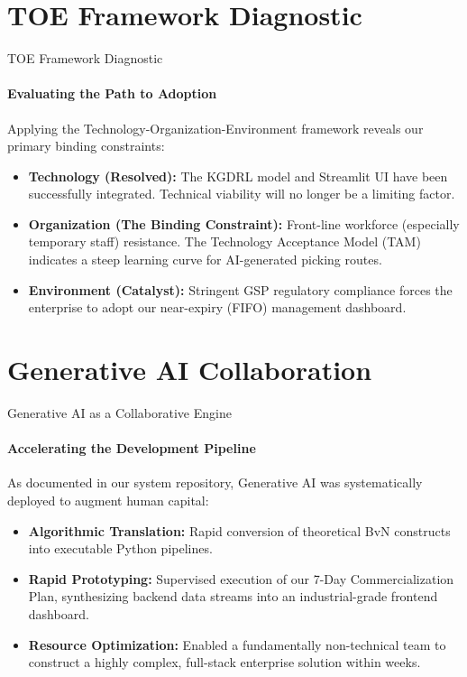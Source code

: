 \documentclass{beamer}
\begin{document}
\section{TOE Framework Diagnostic}

\begin{frame}{TOE Framework Diagnostic}
  \framesubtitle{Evaluating the Path to Adoption}
  
  Applying the Technology-Organization-Environment framework reveals our primary binding constraints:
  \vspace{0.3cm}
  \begin{itemize}
      \item \textbf{Technology (Resolved):} The KGDRL model and Streamlit UI have been successfully integrated. Technical viability will no longer be a limiting factor.
      \item \textbf{Organization (The Binding Constraint):} Front-line workforce (especially temporary staff) resistance. The Technology Acceptance Model (TAM) indicates a steep learning curve for AI-generated picking routes.
      \item \textbf{Environment (Catalyst):} Stringent GSP regulatory compliance forces the enterprise to adopt our near-expiry (FIFO) management dashboard.
  \end{itemize}
\end{frame}

\section{Generative AI Collaboration}

\begin{frame}{Generative AI as a Collaborative Engine}
  \framesubtitle{Accelerating the Development Pipeline}
  
  As documented in our system repository, Generative AI was systematically deployed to augment human capital:
  \vspace{0.3cm}
  \begin{itemize}
      \item \textbf{Algorithmic Translation:} Rapid conversion of theoretical BvN constructs into executable Python pipelines.
      \item \textbf{Rapid Prototyping:} Supervised execution of our 7-Day Commercialization Plan, synthesizing backend data streams into an industrial-grade frontend dashboard.
      \item \textbf{Resource Optimization:} Enabled a fundamentally non-technical team to construct a highly complex, full-stack enterprise solution within weeks.
  \end{itemize}
\end{frame}
\end{document}
